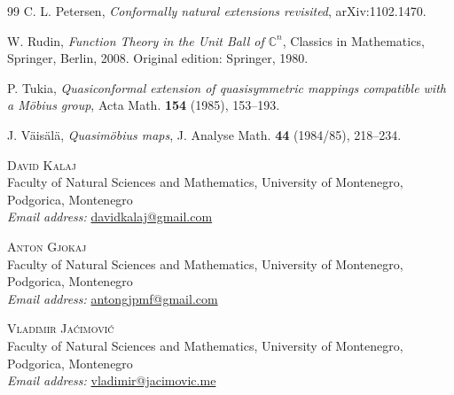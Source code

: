 \documentclass[11pt]{article}
\theoremstyle{definition}
\theoremstyle{remark}
\theoremstyle{definition}
\newcommand{\C}{\mathbb C}
\begin{document}
\begin{thebibliography}{99}
C. L. Petersen,
\emph{Conformally natural extensions revisited},
arXiv:1102.1470.

W. Rudin,
\emph{Function Theory in the Unit Ball of \(\C^n\)},
Classics in Mathematics, Springer, Berlin, 2008.
Original edition: Springer, 1980.

P. Tukia,
\emph{Quasiconformal extension of quasisymmetric mappings compatible with a M\"obius group},
Acta Math. \textbf{154} (1985), 153--193.

J. V\"ais\"al\"a,
\emph{Quasim\"obius maps},
J. Analyse Math. \textbf{44} (1984/85), 218--234.

\end{thebibliography}

\bigskip
\noindent\textsc{David Kalaj}\\
Faculty of Natural Sciences and Mathematics, University of Montenegro, Podgorica, Montenegro\\
\emph{Email address:} \href{mailto:davidkalaj@gmail.com}{davidkalaj@gmail.com}

\medskip
\noindent\textsc{Anton Gjokaj}\\
Faculty of Natural Sciences and Mathematics, University of Montenegro, Podgorica, Montenegro\\
\emph{Email address:} \href{mailto:antongjpmf@gmail.com}{antongjpmf@gmail.com}

\medskip
\noindent\textsc{Vladimir Ja\'cimovi\'c}\\
Faculty of Natural Sciences and Mathematics, University of Montenegro, Podgorica, Montenegro\\
\emph{Email address:} \href{mailto:vladimir@jacimovic.me}{vladimir@jacimovic.me}
\end{document}

